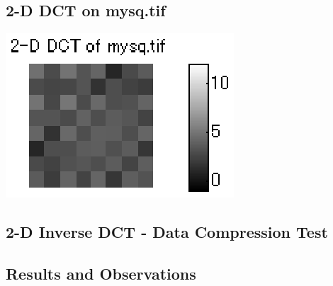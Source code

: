 \documentclass[12pt]{article}
\begin{document}
\subsection{2-D DCT on mysq.tif}

\begin{center}
\includegraphics{../images/II2dctimg0.eps}
\end{center}

\subsection{2-D Inverse DCT - Data Compression Test}

\subsection{Results and Observations}
\end{document}
